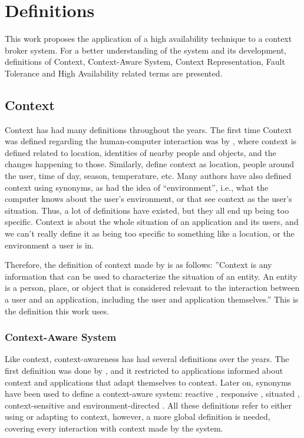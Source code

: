 \chapter{Definitions}
\label{chap:definitions}
This work proposes the application of a high availability technique to a context broker system. For a better understanding of the system and its development, definitions of Context, Context-Aware System, Context Representation, Fault Tolerance and High Availability related terms are presented.

\section{Context}
\label{sec:context}

Context has had many definitions throughout the years. The first time Context was defined regarding the human-computer interaction was by \cite{schilit1994disseminating}, where context is defined related to location, identities of nearby people and objects, and the changes happening to those.  Similarly, \cite{brown1997context} define context as location, people around the user, time of day, season, temperature, etc. Many authors have also defined context using synonyms, as \cite{brown1995stick} had the idea of “environment”, i.e., what the computer knows about the user's environment, or \cite{franklin1998all} that see context as the user's situation. Thus, a lot of definitions have existed, but they all end up being too specific. Context is about the whole situation of an application and its users, and we can't really define it as being too specific to something like a location, or the environment a user is in.

Therefore, the definition of context made by \cite{dey2000providing} is as follows: ''Context is any information that can be used to characterize the situation of an entity. An entity is a person, place, or object that is considered relevant to the interaction between a user and an application, including the user and application themselves.'' This is the definition this work uses.

\subsection{Context-Aware System}
Like context, context-awareness has had several definitions over the years. The first definition was done by \cite{schilit1994disseminating}, and it restricted to applications informed about context and applications that adapt themselves to context. Later on, synonyms have been used to define a context-aware system: reactive \cite{cooperstock1995evolution}, responsive \cite{elrod1993responsive}, situated \cite{hull1997towards}, context-sensitive  \cite{rekimoto1998augment} and environment-directed \cite{fickas1997software}. All these definitions refer to either using or adapting to context, however, a more global definition is needed, covering every interaction with context made by the system.

